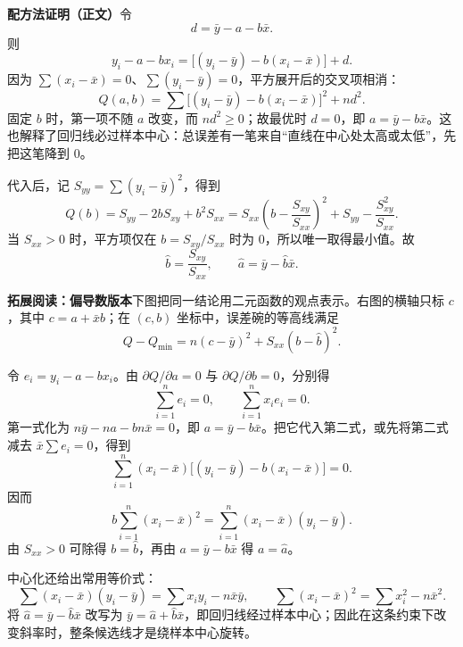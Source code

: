 \clearpage
\begin{proofbox}
\textbf{配方法证明（正文）}\quad 令
\[
d=\bar y-a-b\bar x.
\]
则
\[
y_i-a-bx_i=\bigl[(y_i-\bar y)-b(x_i-\bar x)\bigr]+d.
\]
因为 $\sum(x_i-\bar x)=0$、$\sum(y_i-\bar y)=0$，平方展开后的交叉项相消：
\[
Q(a,b)=\sum\bigl[(y_i-\bar y)-b(x_i-\bar x)\bigr]^2+nd^2.
\]
固定 $b$ 时，第一项不随 $a$ 改变，而 $nd^2\ge0$；故最优时 $d=0$，即 $a=\bar y-b\bar x$。这也解释了回归线必过样本中心：总误差有一笔来自“直线在中心处太高或太低”，先把这笔降到 $0$。

代入后，记 $S_{yy}=\sum(y_i-\bar y)^2$，得到
\[
Q(b)=S_{yy}-2bS_{xy}+b^2S_{xx}
=S_{xx}\left(b-\frac{S_{xy}}{S_{xx}}\right)^2
+S_{yy}-\frac{S_{xy}^2}{S_{xx}}.
\]
当 $S_{xx}>0$ 时，平方项仅在 $b=S_{xy}/S_{xx}$ 时为 $0$，所以唯一取得最小值。故
\[
\hat b=\frac{S_{xy}}{S_{xx}},\qquad \hat a=\bar y-\hat b\bar x.
\]

\textbf{拓展阅读：偏导数版本}\quad 下图把同一结论用二元函数的观点表示。右图的横轴只标 $c$，其中 $c=a+\bar x b$；在 $(c,b)$ 坐标中，误差碗的等高线满足
\[
Q-Q_{\min}=n(c-\bar y)^2+S_{xx}(b-\hat b)^2.
\]



令 $e_i=y_i-a-bx_i$。由 $\partial Q/\partial a=0$ 与 $\partial Q/\partial b=0$，分别得
\[
 \sum_{i=1}^n e_i=0,\qquad \sum_{i=1}^n x_i e_i=0.
\]
第一式化为 $n\bar y-na-bn\bar x=0$，即 $a=\bar y-b\bar x$。把它代入第二式，或先将第二式减去 $\bar x\sum e_i=0$，得到
\[
 \sum_{i=1}^n(x_i-\bar x)\bigl[(y_i-\bar y)-b(x_i-\bar x)\bigr]=0.
\]
因而
\[
 b\sum_{i=1}^n(x_i-\bar x)^2=\sum_{i=1}^n(x_i-\bar x)(y_i-\bar y).
\]
由 $S_{xx}>0$ 可除得 $b=\hat b$，再由 $a=\bar y-b\bar x$ 得 $a=\hat a$。

\clearpage


中心化还给出常用等价式：
\[
 \sum(x_i-\bar x)(y_i-\bar y)=\sum x_iy_i-n\bar x\bar y,\qquad
 \sum(x_i-\bar x)^2=\sum x_i^2-n\bar x^2.
\]
将 $\hat a=\bar y-\hat b\bar x$ 改写为 $\bar y=\hat a+\hat b\bar x$，即回归线经过样本中心；因此在这条约束下改变斜率时，整条候选线才是绕样本中心旋转。
\end{proofbox}
